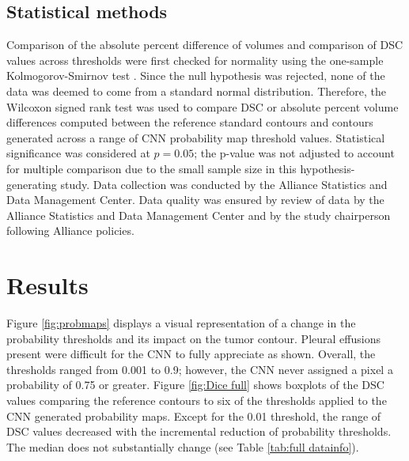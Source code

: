 \documentclass{article}
\begin{document}
\subsection{Statistical methods}
Comparison of the absolute percent difference of volumes and comparison of DSC values across thresholds were first checked for normality using the one-sample Kolmogorov-Smirnov test \cite{KV_test}. Since the null hypothesis was rejected, none of the data was deemed to come from a standard normal distribution. Therefore, the Wilcoxon signed rank test was used to compare DSC or absolute percent volume differences computed between the reference standard contours and contours generated across a range of CNN probability map threshold values. Statistical significance was considered at $p=0.05$; the p-value was not adjusted to account for multiple comparison due to the small sample size in this hypothesis-generating study. Data collection was conducted by the Alliance Statistics and Data Management Center. Data quality was ensured by review of data by the Alliance Statistics and Data Management Center and by the study chairperson following Alliance policies.

\section{Results}
Figure \ref{fig:probmaps} displays a visual representation of a change in the probability thresholds and its impact on the tumor contour. Pleural effusions present were difficult for the CNN to fully appreciate as shown. Overall, the thresholds ranged from 0.001 to 0.9; however, the CNN never assigned a pixel a probability of 0.75 or greater. Figure \ref{fig:Dice full} shows boxplots of the DSC values comparing the reference contours to six of the thresholds applied to the CNN generated probability maps. Except for the 0.01 threshold, the range of DSC values decreased with the incremental reduction of probability thresholds. The median does not substantially change (see Table \ref{tab:full datainfo}).  
\end{document}

